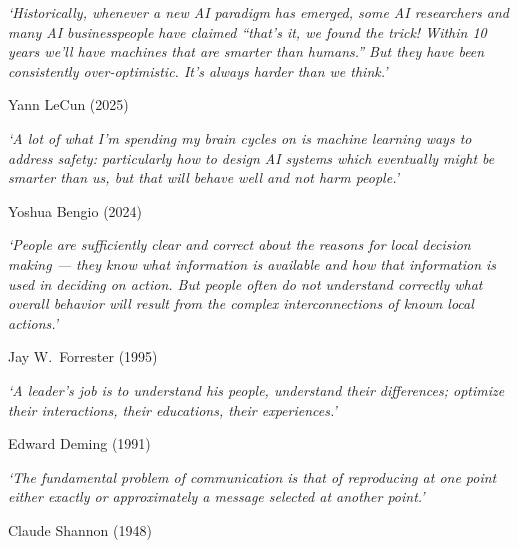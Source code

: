 \vspace*{3cm}

\noindent\textit{`Historically, whenever a new AI paradigm has emerged, some AI researchers and many AI businesspeople have claimed ``that's it, we found the trick! Within 10 years we'll have machines that are smarter than humans.'' But they have been consistently over-optimistic. It's always harder than we think.'}

\hfill Yann LeCun (2025)

\vspace{1.2cm}

\noindent\textit{`A lot of what I'm spending my brain cycles on is machine learning ways to address safety: particularly how to design AI systems which eventually might be smarter than us, but that will behave well and not harm people.'}

\hfill Yoshua Bengio (2024)

\vspace{1.2cm}

\noindent\textit{`People are sufficiently clear and correct about the reasons for local decision making --- they know what information is available and how that information is used in deciding on action. But people often do not understand correctly what overall behavior will result from the complex interconnections of known local actions.'}

\hfill Jay W.\ Forrester (1995)

\vspace{1.2cm}

\noindent\textit{`A leader's job is to understand his people, understand their differences; optimize their interactions, their educations, their experiences.'}

\hfill Edward Deming (1991)

\vspace{1.2cm}

\noindent\textit{`The fundamental problem of communication is that of reproducing at one point either exactly or approximately a message selected at another point.'}

\hfill Claude Shannon (1948)

\newpage\thispagestyle{empty}\mbox{}\newpage

{}


